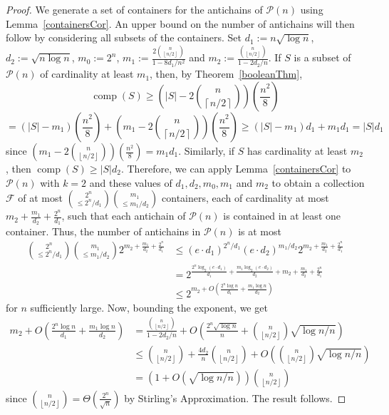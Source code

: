 \documentclass[11 pt]{article}
\theoremstyle{definition}
\theoremstyle{case}
\numberwithin{equation}{section}
\DeclareMathOperator{\comp}{comp}
\begin{document}
\begin{proof}
We generate a set of containers for the antichains of $\mathcal{P}(n)$ using Lemma~\ref{containersCor}. An upper bound on the number of antichains will then follow by considering all subsets of the containers. Set $d_1:=n\sqrt{\log{n}}$, $d_2:=\sqrt{n\log{n}}$, $m_0:=2^n$, $m_1:=\frac{2\binom{n}{\left\lfloor n/2\right\rfloor}}{1-8d_1/n^2}$ and $m_2:=\frac{\binom{n}{\left\lfloor n/2\right\rfloor}}{1-2d_2/n}$. If $S$ is a subset of $\mathcal{P}(n)$ of cardinality at least $m_1$, then, by Theorem~\ref{booleanThm},
\[\comp(S)\geq \left(|S| - 2\binom{n}{\left\lceil n/2\right\rceil}\right)\left(\frac{n^2}{8}\right)\]
\[ = \left(|S|-m_1\right)\left(\frac{n^2}{8}\right) + \left(m_1 - 2\binom{n}{\left\lceil n/2\right\rceil}\right)\left(\frac{n^2}{8}\right) \geq (|S|-m_1)d_1 + m_1d_1 = |S|d_1\]
since $\left(m_1-2\binom{n}{\left\lfloor n/2\right\rfloor}\right)\left(\frac{n^2}{8}\right) = m_1d_1$.  Similarly, if $S$ has cardinality at least $m_2$, then $\comp(S)\geq |S|d_2$. Therefore, we can apply Lemma~\ref{containersCor} to $\mathcal{P}(n)$ with $k=2$ and these values of $d_1,d_2,m_0,m_1$ and $m_2$ to obtain a collection $\mathcal{F}$ of at most $\binom{2^n}{\leq 2^n/d_1}\binom{m_1}{\leq m_1/d_2}$ containers, each of cardinality at most $m_2+\frac{m_1}{d_2}+\frac{2^n}{d_1}$, such that each antichain of $\mathcal{P}(n)$ is contained in at least one container. Thus, the number of antichains in $\mathcal{P}(n)$ is at most
\begin{align*}\binom{2^n}{\leq 2^n/d_1}\binom{m_1}{\leq m_1/d_2}2^{m_2+\frac{m_1}{d_2} + \frac{2^n}{d_1}}
&\leq \left(e\cdot d_1\right)^{2^n/d_1}\left(e\cdot d_2\right)^{m_1/d_2}2^{m_2+\frac{m_1}{d_2} + \frac{2^n}{d_1}}\\
&= 2^{\frac{2^n\log_2(e\cdot d_1)}{d_1} + \frac{m_1\log_2(e\cdot d_2)}{d_2} + m_2 + \frac{m_1}{d_2} + \frac{2^n}{d_1}} \\
&\leq 2^{m_2 + O\left(\frac{2^n\log{n}}{d_1} + \frac{m_1\log{n}}{d_2}\right)}\end{align*}
for $n$ sufficiently large. Now, bounding the exponent, we get
\begin{align*}m_2 + O\left(\frac{2^n\log{n}}{d_1} + \frac{m_1\log{n}}{d_2}\right)&= \frac{\binom{n}{\left\lfloor n/2\right\rfloor}}{1-2d_2/n} + O\left(\frac{2^n\sqrt{\log{n}}}{n} + \binom{n}{\left\lfloor n/2\right\rfloor}\sqrt{\log{n}/n}\right)\\
&\leq \binom{n}{\left\lfloor n/2\right\rfloor} + \frac{4d_2}{n} \binom{n}{\left\lfloor n/2\right\rfloor} +O\left(\binom{n}{\left\lfloor n/2\right\rfloor}\sqrt{\log{n}/n}\right)\\
& = \left(1+O\left(\sqrt{\log{n}/n}\right)\right)\binom{n}{\left\lfloor n/2\right\rfloor}\end{align*}
since $\binom{n}{\left\lfloor n/2\right\rfloor} =\Theta\left(\frac{2^n}{\sqrt{n}}\right)$ by Stirling's Approximation. The result follows.
\end{proof}
\end{document}
